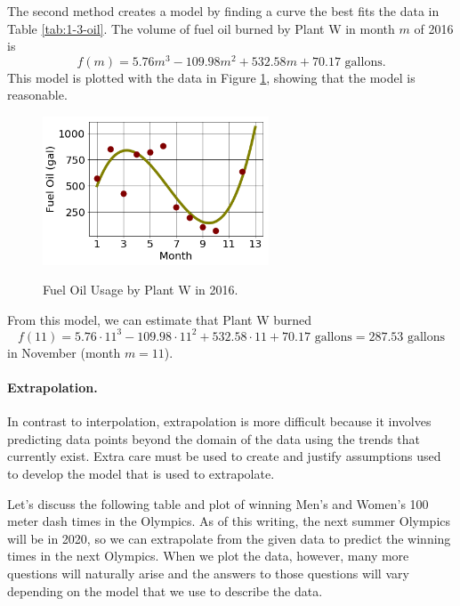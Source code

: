 \begin{example}
\begin{solution}
The second method creates a model by finding a curve the best fits the data in Table \ref{tab:1-3-oil}. The volume of fuel oil burned by Plant W in month $m$ of 2016 is
$$f(m) = 5.76m^3 - 109.98m^2 + 532.58m + 70.17\mbox{ gallons.}$$
This model is plotted with the data in Figure \ref{fig:1-3-oil-model}, showing that the model is reasonable.
\begin{figure}[!ht]
    \centering
    \includegraphics[width=0.6\textwidth]{img/chap1/sec1-3/fig1-3-oil-curve.png}\\
    \caption{Fuel Oil Usage by Plant W in 2016.}
    \label{fig:1-3-oil-model}
  \end{figure}

From this model, we can estimate that Plant W burned
$$f(11) = 5.76\cdot 11^3 - 109.98\cdot 11^2 + 532.58\cdot 11 + 70.17\mbox{ gallons} = 287.53 \mbox{ gallons}$$
in November (month $m=11$).
\end{solution}\end{example}

\paragraph{Extrapolation.} In contrast to interpolation, extrapolation is more difficult because it involves predicting data points beyond the domain of the data using the trends that currently exist. Extra care must be used to create and justify assumptions used to develop the model that is used to extrapolate.

Let's discuss the following table and plot of winning Men's and Women's 100 meter dash times in the Olympics. As of this writing, the next summer Olympics will be in 2020, so we can extrapolate from the given data to predict the winning times in the next Olympics. When we plot the data, however, many more questions will naturally arise and the answers to those questions will vary depending on the model that we use to describe the data.


